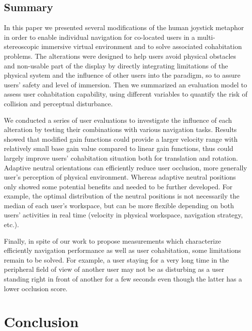 \subsection{Summary}
In this paper we presented several modifications of the human joystick metaphor in order to enable individual navigation for co-located users in a multi-stereoscopic immersive virtual environment and to solve associated cohabitation problems. The alterations were designed to help users avoid physical obstacles and non-usable part of the display by directly integrating limitations of the physical system and the influence of other users into the paradigm, so to assure users' safety and level of immersion. Then we summarized an evaluation model to assess user cohabitation capability, using different variables to quantify the risk of collision and perceptual disturbance.

We conducted a series of user evaluations to investigate the influence of each alteration by testing their combinations with various navigation tasks. Results showed that modified gain functions could provide a larger velocity range with relatively small base gain value compared to linear gain functions, thus could largely improve users' cohabitation situation both for translation and rotation. Adaptive neutral orientations can efficiently reduce user occlusion, more generally user's perception of physical environment. Whereas adaptive neutral positions only showed some potential benefits and needed to be further developed. For example, the optimal distribution of the neutral positions is not necessarily the median of each user's workspace, but can be more flexible depending on both users' activities in real time (velocity in physical workspace, navigation strategy, etc.).

Finally, in spite of our work to propose measurements which characterize efficiently navigation performance as well as user cohabitation, some limitations remain to be solved. For example, a user staying for a very long time in the peripheral field of view of another user may not be as disturbing as a user standing right in front of another for a few seconds even though the latter has a lower occlusion score.

\section{Conclusion}


